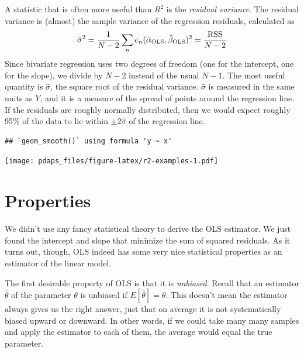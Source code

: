 \documentclass[12pt,oneside,openany]{book}
\begin{document}
A statistic that is often more useful than \(R^2\) is the \emph{residual
variance}. The residual variance is (almost) the sample variance of the
regression residuals, calculated as \[
\hat{\sigma}^2
= \frac{1}{N - 2} \sum_n e_n(\hat{\alpha}_{\text{OLS}}, \hat{\beta}_{\text{OLS}})^2
= \frac{\mathop{\rm RSS}\nolimits}{N - 2}
\] Since bivariate regression uses two degrees of freedom (one for the
intercept, one for the slope), we divide by \(N - 2\) instead of the
usual \(N - 1\). The most useful quantity is \(\hat{\sigma}\), the
square root of the residual variance. \(\hat{\sigma}\) is measured in
the same units as \(Y\), and it is a measure of the spread of points
around the regression line. If the residuals are roughly normally
distributed, then we would expect roughly 95\% of the data to lie within
\(\pm 2 \hat{\sigma}\) of the regression line.

\begin{verbatim}
## `geom_smooth()` using formula 'y ~ x'
\end{verbatim}

\texttt{[image: pdaps\_files/figure-latex/r2-examples-1.pdf]}

\section{Properties}\label{properties}

We didn't use any fancy statistical theory to derive the OLS estimator.
We just found the intercept and slope that minimize the sum of squared
residuals. As it turns out, though, OLS indeed has some very nice
statistical properties as an estimator of the linear model.

The first desirable property of OLS is that it is \emph{unbiased}.
Recall that an estimator \(\hat{\theta}\) of the parameter \(\theta\) is
unbiased if \(E[\hat{\theta}] = \theta\). This doesn't mean the
estimator always gives us the right answer, just that on average it is
not systematically biased upward or downward. In other words, if we
could take many many samples and apply the estimator to each of them,
the average would equal the true parameter.
\end{document}
